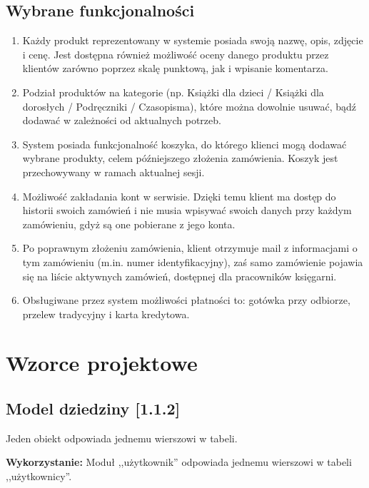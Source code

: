 \documentclass[pdflatex,11pt]{aghdpl}
\begin{document}
\clearpage


\section{Wybrane funkcjonalności}

\begin{enumerate}
\item Każdy produkt reprezentowany w systemie posiada swoją nazwę, opis, zdjęcie i cenę. Jest dostępna również możliwość oceny danego produktu przez klientów zarówno poprzez skalę punktową, jak i wpisanie komentarza.
\item Podział produktów na kategorie (np. Książki dla dzieci / Książki dla dorosłych / Podręczniki / Czasopisma), które można dowolnie usuwać, bądź dodawać w zależności od aktualnych potrzeb.
\item System posiada funkcjonalność koszyka, do którego klienci mogą dodawać wybrane produkty, celem późniejszego złożenia zamówienia. Koszyk jest przechowywany w ramach aktualnej sesji.
\item Możliwość zakładania kont w serwisie. Dzięki temu klient ma dostęp do historii swoich zamówień i nie musia wpisywać swoich danych przy każdym zamówieniu, gdyż są one pobierane z jego konta.
\item Po poprawnym złożeniu zamówienia, klient otrzymuje mail z informacjami o tym zamówieniu (m.in. numer identyfikacyjny), zaś samo zamówienie pojawia się na liście aktywnych zamówień, dostępnej dla pracowników księgarni.
\item Obsługiwane przez system możliwości płatności to: gotówka przy odbiorze, przelew tradycyjny i karta kredytowa.
\end{enumerate}



\chapter{Wzorce projektowe}

\section{Model dziedziny [1.1.2]}

Jeden obiekt odpowiada jednemu wierszowi w tabeli.

\textbf{Wykorzystanie:} Moduł ,,użytkownik'' odpowiada jednemu wierszowi w tabeli ,,użytkownicy''.
\end{document}
